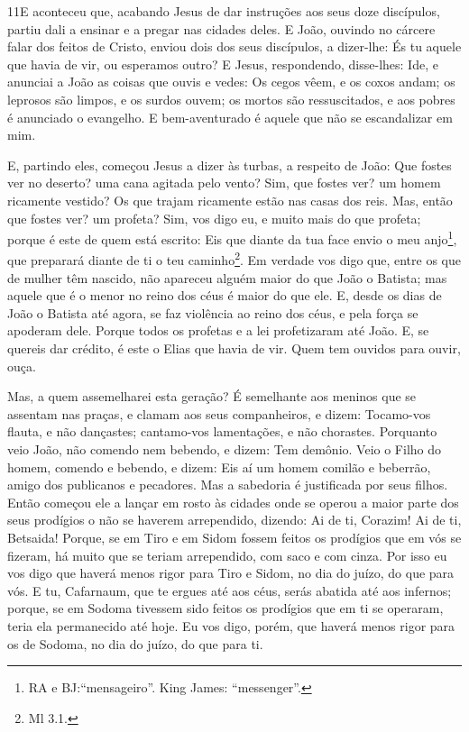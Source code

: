 \medskip

\lettrine{11} E aconteceu que, acabando Jesus de dar
instruções aos seus doze discípulos, partiu dali a ensinar e a
pregar nas cidades deles. E João, ouvindo no cárcere falar dos
feitos de Cristo, enviou dois dos seus discípulos, a dizer-lhe:
És tu aquele que havia de vir, ou esperamos outro? E Jesus,
respondendo, disse-lhes: Ide, e anunciai a João as coisas que ouvis
e vedes: Os cegos vêem, e os coxos andam; os leprosos são
limpos, e os surdos ouvem; os mortos são ressuscitados, e aos pobres
é anunciado o evangelho. E bem-aventurado é aquele que não se
escandalizar em mim.

E, partindo eles, começou Jesus a dizer às turbas, a respeito de
João: Que fostes ver no deserto? uma cana agitada pelo vento?
Sim, que fostes ver? um homem ricamente vestido? Os que trajam
ricamente estão nas casas dos reis. Mas, então que fostes ver?
um profeta? Sim, vos digo eu, e muito mais do que profeta;
porque é este de quem está escrito: Eis que diante da tua
face envio o meu anjo\footnote{RA e BJ:``mensageiro''. King James:
``messenger''.}, que preparará diante de ti o teu
caminho\footnote{Ml 3.1.}. Em verdade vos digo que, entre os
que de mulher têm nascido, não apareceu alguém maior do que João o
Batista; mas aquele que é o menor no reino dos céus é maior do que
ele. E, desde os dias de João o Batista até agora, se faz
violência ao reino dos céus, e pela força se apoderam dele.
Porque todos os profetas e a lei profetizaram até João.
E, se quereis dar crédito, é este o Elias que havia de vir.
Quem tem ouvidos para ouvir, ouça.

Mas, a quem assemelharei esta geração? É semelhante aos meninos
que se assentam nas praças, e clamam aos seus companheiros, e
dizem: Tocamo-vos flauta, e não dançastes; cantamo-vos lamentações,
e não chorastes. Porquanto veio João, não comendo nem
bebendo, e dizem: Tem demônio. Veio o Filho do homem, comendo
e bebendo, e dizem: Eis aí um homem comilão e beberrão, amigo dos
publicanos e pecadores. Mas a sabedoria é justificada por seus
filhos. Então começou ele a lançar em rosto às cidades onde
se operou a maior parte dos seus prodígios o não se haverem
arrependido, dizendo: Ai de ti, Corazim! Ai de ti, Betsaida!
Porque, se em Tiro e em Sidom fossem feitos os prodígios que em vós
se fizeram, há muito que se teriam arrependido, com saco e com
cinza. Por isso eu vos digo que haverá menos rigor para Tiro
e Sidom, no dia do juízo, do que para vós. E tu, Cafarnaum,
que te ergues até aos céus, serás abatida até aos infernos; porque,
se em Sodoma tivessem sido feitos os prodígios que em ti se
operaram, teria ela permanecido até hoje. Eu vos digo, porém,
que haverá menos rigor para os de Sodoma, no dia do juízo, do que
para ti.

